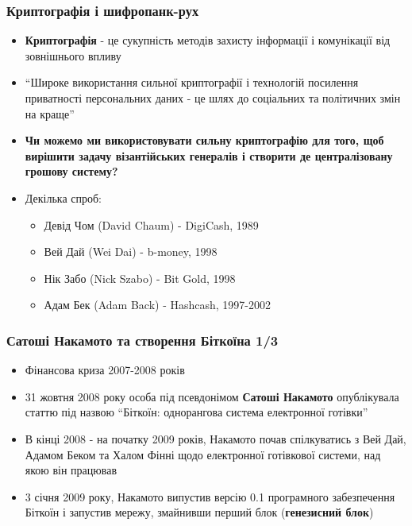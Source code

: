 \documentclass{beamer}
\begin{document}
\begin{frame}
  \frametitle{Криптографія і шифропанк-рух}
  \begin{itemize}
  \item \textbf{Криптографія} - це сукупність методів захисту інформації і
    комунікації від зовнішнього впливу
  \item ``Широке використання сильної криптографії і технологій посилення
    приватності персональних даних - це шлях до соціальних та політичних змін на
    краще''
  \item \textbf{Чи можемо ми використовувати сильну криптографію для того, щоб
      вирішити задачу візантійських генералів і створити де централізовану
      грошову систему?}
  \item Декілька спроб:
    \begin{itemize}
    \item Девід Чом (David Chaum) - DigiCash, 1989
    \item Вей Дай (Wei Dai) - b-money, 1998
    \item Нік Забо (Nick Szabo) - Bit Gold, 1998
    \item Адам Бек (Adam Back) - Hashcash, 1997-2002
    \end{itemize}
  \end{itemize}
\end{frame}

\begin{frame}
  \frametitle{Сатоші Накамото та створення Біткоїна 1/3}
  \begin{itemize}
  \item Фінансова криза 2007-2008 років
  \item 31 жовтня 2008 року особа під псевдонімом \textbf{Сатоші Накамото}
    опублікувала статтю під назвою ``Біткоїн: однорангова система електронної готівки''
  \item В кінці 2008 - на початку 2009 років, Накамото почав спілкуватись з Вей
    Дай, Адамом Беком та Халом Фінні щодо електронної готівкової системи, над
    якою він працював
  \item 3 січня 2009 року, Накамото випустив версію 0.1 програмного забезпечення
    Біткоїн і запустив мережу, змайнивши перший блок (\textbf{генезисний блок})
  \end{itemize}
\end{frame}
\end{document}
